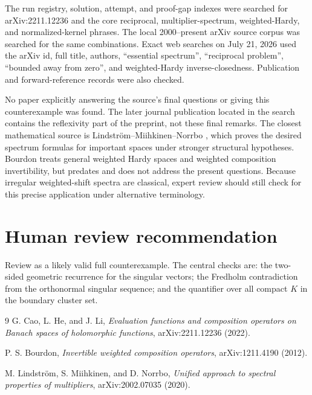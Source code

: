\documentclass[11pt]{article}
\begin{document}
The run registry, solution, attempt, and proof-gap indexes were searched for
arXiv:2211.12236 and the core reciprocal, multiplier-spectrum, weighted-Hardy,
and normalized-kernel phrases.  The local 2000--present arXiv source corpus
was searched for the same combinations.  Exact web searches on July 21, 2026
used the arXiv id, full title, authors, ``essential spectrum'', ``reciprocal
problem'', ``bounded away from zero'', and weighted-Hardy inverse-closedness.
Publication and forward-reference records were also checked.

No paper explicitly answering the source's final questions or giving this
counterexample was found.  The later journal publication located in the
search contains the reflexivity part of the preprint, not these final remarks.
The closest mathematical source is Lindstr\"om--Miihkinen--Norrbo
\cite{LMN}, which proves the desired spectrum formulas for important spaces
under stronger structural hypotheses.  Bourdon \cite{Bourdon} treats general
weighted Hardy spaces and weighted composition invertibility, but predates
and does not address the present questions.  Because irregular weighted-shift
spectra are classical, expert review should still check for this precise
application under alternative terminology.

\section*{Human review recommendation}

Review as a likely valid full counterexample.  The central checks are: the
two-sided geometric recurrence for the singular vectors; the Fredholm
contradiction from the orthonormal singular sequence; and the quantifier over
all compact $K$ in the boundary cluster set.

\begin{thebibliography}{9}
G. Cao, L. He, and J. Li,
\emph{Evaluation functions and composition operators on Banach spaces of
holomorphic functions}, arXiv:2211.12236 (2022).

P. S. Bourdon,
\emph{Invertible weighted composition operators},
arXiv:1211.4190 (2012).

M. Lindstr\"om, S. Miihkinen, and D. Norrbo,
\emph{Unified approach to spectral properties of multipliers},
arXiv:2002.07035 (2020).
\end{thebibliography}
\end{document}
